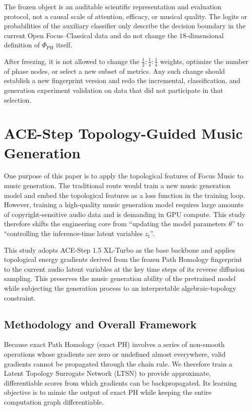 \documentclass{article}
\begin{document}
The frozen object is an auditable scientific representation and evaluation protocol, not a causal scale of attention, efficacy, or musical quality. The logits or probabilities of the auxiliary classifier only describe the decision boundary in the current Open Focus--Classical data and do not change the $18$-dimensional definition of $\Phi_{\mathrm{PH}}$ itself.

After freezing, it is not allowed to change the $\frac{1}{2}:\frac{1}{4}:\frac{1}{4}$ weights, optimize the number of phase nodes, or select a new subset of metrics. Any such change should establish a new fingerprint version and redo the incremental, classification, and generation experiment validation on data that did not participate in that selection.

\section{ACE-Step Topology-Guided Music Generation}

One purpose of this paper is to apply the topological features of Focus Music to music generation. The traditional route would train a new music generation model and embed the topological features as a loss function in the training loop. However, training a high-quality music generation model requires large amounts of copyright-sensitive audio data and is demanding in GPU compute. This study therefore shifts the engineering core from ``updating the model parameters $\theta$'' to ``controlling the inference-time latent variables $z_t$''.

This study adopts ACE-Step 1.5 XL-Turbo as the base backbone and applies topological energy gradients derived from the frozen Path Homology fingerprint to the current audio latent variables at the key time steps of its reverse diffusion sampling. This preserves the music generation ability of the pretrained model while subjecting the generation process to an interpretable algebraic-topology constraint.

\subsection{Methodology and Overall Framework}

Because exact Path Homology (exact PH) involves a series of non-smooth operations whose gradients are zero or undefined almost everywhere, valid gradients cannot be propagated through the chain rule. We therefore train a Latent Topology Surrogate Network (LTSN) to provide approximate, differentiable scores from which gradients can be backpropagated. Its learning objective is to mimic the output of exact PH while keeping the entire computation graph differentiable.
\end{document}
